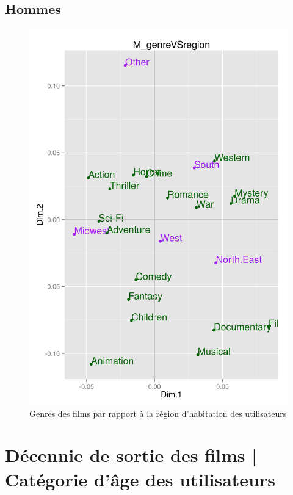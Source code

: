 \documentclass[11pt]{article}
\begin{document}
\subsection{Hommes}
\begin{figure}[htd]
\centering
\includegraphics[scale=0.65]{./images/M_genreVSregion}
\caption{Genres des films par rapport à la région d'habitation des utilisateurs}
\end{figure}

\pagebreak
\section{Décennie de sortie des films | Catégorie d'âge des utilisateurs}
\end{document}
